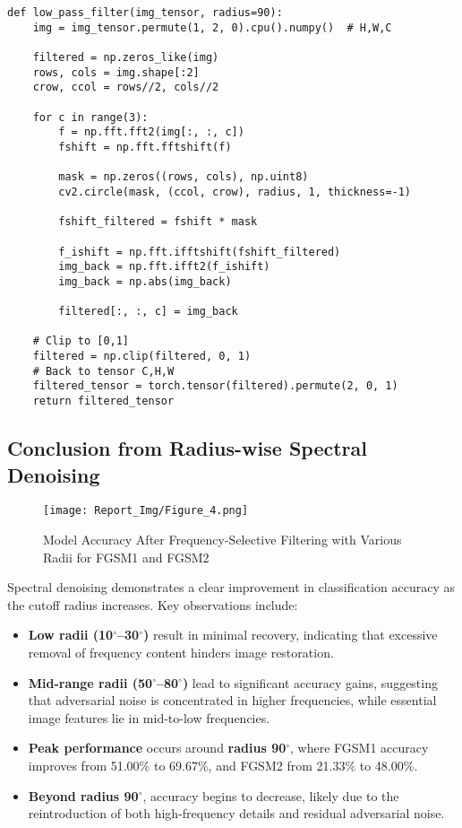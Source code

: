 \documentclass[a4paper,12pt]{report}%
\begin{document}
\begin{verbatim}
def low_pass_filter(img_tensor, radius=90):
    img = img_tensor.permute(1, 2, 0).cpu().numpy()  # H,W,C

    filtered = np.zeros_like(img)
    rows, cols = img.shape[:2]
    crow, ccol = rows//2, cols//2

    for c in range(3):
        f = np.fft.fft2(img[:, :, c])
        fshift = np.fft.fftshift(f)

        mask = np.zeros((rows, cols), np.uint8)
        cv2.circle(mask, (ccol, crow), radius, 1, thickness=-1)

        fshift_filtered = fshift * mask

        f_ishift = np.fft.ifftshift(fshift_filtered)
        img_back = np.fft.ifft2(f_ishift)
        img_back = np.abs(img_back)

        filtered[:, :, c] = img_back

    # Clip to [0,1]
    filtered = np.clip(filtered, 0, 1)
    # Back to tensor C,H,W
    filtered_tensor = torch.tensor(filtered).permute(2, 0, 1)
    return filtered_tensor
\end{verbatim}

\subsection{Conclusion from Radius-wise Spectral Denoising}
\begin{figure}[H]
\centering
\texttt{[image: Report\_Img/Figure\_4.png]}
\caption{Model Accuracy After Frequency-Selective Filtering with Various Radii for FGSM1 and FGSM2}
\end{figure}

Spectral denoising demonstrates a clear improvement in classification accuracy as the cutoff radius increases. Key observations include:

\begin{itemize}
    \item \textbf{Low radii (10$^{\circ}$--30$^{\circ}$)} result in minimal recovery, indicating that excessive removal of frequency content hinders image restoration.
    
    \item \textbf{Mid-range radii (50$^{\circ}$--80$^{\circ}$)} lead to significant accuracy gains, suggesting that adversarial noise is concentrated in higher frequencies, while essential image features lie in mid-to-low frequencies.
    
    \item \textbf{Peak performance} occurs around \textbf{radius 90$^{\circ}$}, where FGSM1 accuracy improves from 51.00\% to 69.67\%, and FGSM2 from 21.33\% to 48.00\%.
    
    \item \textbf{Beyond radius 90$^{\circ}$}, accuracy begins to decrease, likely due to the reintroduction of both high-frequency details and residual adversarial noise.
\end{itemize}
\end{document}
